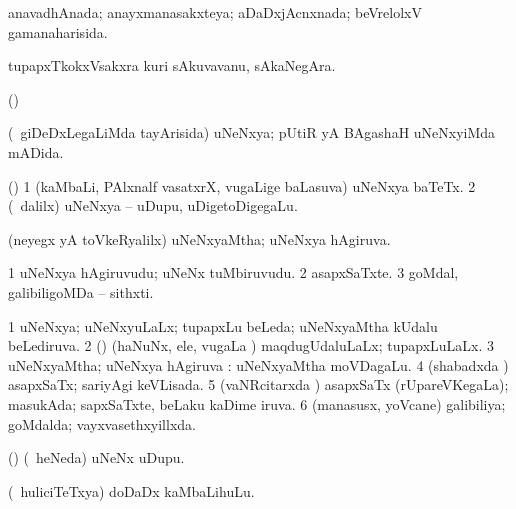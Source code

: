{{{{{{{ \bentry
{} 
\gl{\gu}
\expl{}
\bmng
anavadhAnada; anayxmanasakxteya; aDaDxjAcnxnada; beVrelolxV gamanaharisida. 
\emng
\eentry

\bentry
{} 
\gl{\nA}
\expl{}
\bmng
tupapxTkokxVsakxra kuri sAkuvavanu, sAkaNegAra. 
\emng
\eentry

\bentry
{} 
\gl{\gu}
\expl{}
\bmng
(\ame)  
\emng
\eentry

\bentry
{} 
\gl{\gu}
\expl{}
\bmng
(\kanmu\ giDeDxLegaLiMda tayArisida) uNeNxya; pUtiR yA BAgashaH uNeNxyiMda mADida. 
\emng
\eentry

\bentry
{} 
\gl{\nA}
\expl{}
\bmng
(\ame) 
\bnum
\num{1} (kaMbaLi, PAlxnalf vasatxrX, \mo vugaLige baLasuva) uNeNxya baTeTx. 
\num{2} (\kanmu\ \bava dalilx) uNeNxya -- uDupu, uDigetoDigegaLu. 
\enum
\emng
\eentry

\bentry
{} 
\gl{\gu}
\expl{}
\bmng
(neyegx yA toVkeRyalilx) uNeNxyaMtha; uNeNxya hAgiruva. 
\emng
\eentry

\bentry
{} 
\gl{\nA}
\expl{}
\bmng
\bnum
\num{1} uNeNxya hAgiruvudu; uNeNx tuMbiruvudu. 
\num{2} asapxSaTxte. 
\num{3} goMdal, galibiligoMDa -- sithxti. 
\enum
\emng
\eentry

\bentry
{} 
\gl{\gu}
\bmng
\bnum
\num{1} uNeNxya; uNeNxyuLaLx; tupapxLu beLeda; uNeNxyaMtha kUdalu beLediruva. 
\num{2} (\savi) (haNuNx, ele, \mo vugaLa \vi) maqdugUdaluLaLx; tupapxLuLaLx. 
\num{3} uNeNxyaMtha; uNeNxya hAgiruva :  uNeNxyaMtha moVDagaLu. 
\num{4} (shabadxda \vi) asapxSaTx; sariyAgi keVLisada. 
\num{5} (vaNRcitarxda \vi) asapxSaTx (rUpareVKegaLa); masukAda; sapxSaTxte, beLaku kaDime iruva. 
\num{6} (manasusx, yoVcane) galibiliya; goMdalda; vayxvasethxyillxda. 
\enum
\emng
\eentry

\bentry
{} 
\gl{\nA}
\bmng
(\AmA) (\kanmu\ heNeda) uNeNx uDupu. 
\emng
\eentry

\bentry
{} 
\gl{\nA}
\expl{}
\bmng
(\kanmu\ huliciTeTxya) doDaDx kaMbaLihuLu. 
\emng
\eentry

\bentry
{} 
\gl{\nA}
\expl{}
\bmng
{} 
\emng
\eentry

}}}}}}}
